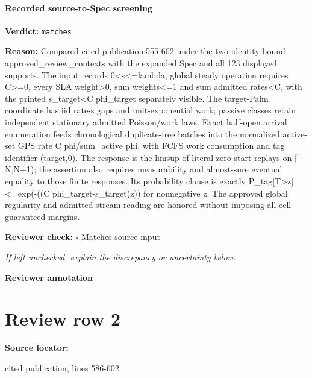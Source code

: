 \documentclass[10pt]{article}
\newcommand{\reviewerbox}{%
  \par\noindent\fbox{\parbox{0.96\linewidth}{\rule{0pt}{0.38in}}}\par
}
\newcommand{\reviewmatch}[1]{%
  \par\noindent\textbf{Reviewer check:} $\square$\; #1\par
  \noindent\emph{If left unchecked, explain the discrepancy or uncertainty below.}\par
}
\begin{document}
\paragraph{Recorded source-to-Spec screening}
\textbf{Verdict:} \texttt{matches}
\\
{\raggedright
\textbf{Reason:} Compared cited publication:\allowbreak{}555-\allowbreak{}602 under the two identity-\allowbreak{}bound approved\_\allowbreak{}review\_\allowbreak{}contexts with the expanded Spec and all 123 displayed supports.\allowbreak{} The input records 0<s<=lambda;\allowbreak{} global steady operation requires C>=0, every SLA weight>0, sum weights<=1 and sum admitted rates<C, with the printed s\_\allowbreak{}target<C phi\_\allowbreak{}target separately visible.\allowbreak{} The target-\allowbreak{}Palm coordinate has iid rate-\allowbreak{}s gaps and unit-\allowbreak{}exponential work;\allowbreak{} passive classes retain independent stationary admitted Poisson/\allowbreak{}work laws.\allowbreak{} Exact half-\allowbreak{}open arrival enumeration feeds chronological duplicate-\allowbreak{}free batches into the normalized active-\allowbreak{}set GPS rate C phi/\allowbreak{}sum\_\allowbreak{}active phi, with FCFS work consumption and tag identifier (target,0).\allowbreak{} The response is the limsup of literal zero-\allowbreak{}start replays on [-\allowbreak{}N,N+1);\allowbreak{} the assertion also requires measurability and almost-\allowbreak{}sure eventual equality to those finite responses.\allowbreak{} Its probability clause is exactly P\_\allowbreak{}tag[T>z]<=exp(-\allowbreak{}((C phi\_\allowbreak{}target-\allowbreak{}s\_\allowbreak{}target)z)) for nonnegative z.\allowbreak{} The approved global regularity and admitted-\allowbreak{}stream reading are honored without imposing all-\allowbreak{}cell guaranteed margins.\allowbreak{}
\par}
\reviewmatch{Matches source input}
\noindent\textbf{Reviewer annotation}\par
\reviewerbox
\clearpage
\hypertarget{source-claim-9d4c601e07d3ec6f}{}
\section*{Review row 2}
\textbf{Source locator:} {\footnotesize\raggedright cited publication, lines 586-\allowbreak{}602\par}
\end{document}
